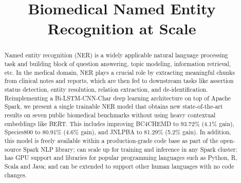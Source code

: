 \documentclass[a4paper,conference]{IEEEtran}
\begin{document}
\title{Biomedical Named Entity Recognition at Scale}

\author{
\and
{}
}













\maketitle

\begin{abstract}
Named entity recognition (NER) is a widely applicable natural language processing task and building block of question answering, topic modeling, information retrieval, etc. 
In the medical domain, NER plays a crucial role by extracting meaningful chunks from clinical notes and reports, which are then fed to downstream tasks like assertion status detection, entity resolution, relation extraction, and de-identification. 
Reimplementing a Bi-LSTM-CNN-Char deep learning architecture on top of Apache Spark, we present a single trainable NER model that obtains new state-of-the-art results on seven public biomedical benchmarks without using heavy contextual embeddings like BERT. 
This includes improving BC4CHEMD to 93.72\% (4.1\% gain), Species800 to 80.91\% (4.6\% gain), and JNLPBA to 81.29\% (5.2\% gain). In addition, this model is freely available within a production-grade code base as part of the open-source Spark NLP library; can scale up for training and inference in any Spark cluster; has GPU support and libraries for popular programming languages such as Python, R, Scala and Java; and can be extended to support other human languages with no code changes.
\end{abstract}



\IEEEpeerreviewmaketitle
\end{document}
